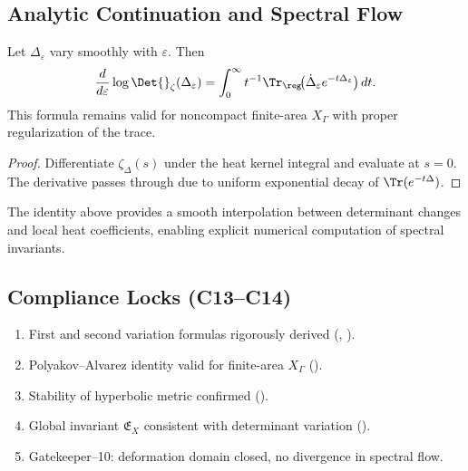 \subsection{Analytic Continuation and Spectral Flow}\relax\hspace{0pt}
\label{subsec:spectral-flow}\relax\hspace{0pt}

\begin{lemma}\label{lem:spectral-flow}\relax
Let $\Delta_\varepsilon$ vary smoothly with $\varepsilon$. Then
\[
\frac{d}{d\varepsilon}\log\Det{}_\zeta(\Delta_\varepsilon)
=\int_0^\infty t^{-1}\Tr_\reg\!\big(\dot\Delta_\varepsilon e^{-t\Delta_\varepsilon}\big)\,dt.
\]
This formula remains valid for noncompact finite-area $X_\Gamma$ with proper regularization of the trace. %
\end{lemma}

\begin{proof}\relax
Differentiate $\zeta_\Delta(s)$ under the heat kernel integral and evaluate at $s=0$. The derivative passes through due to uniform exponential decay of $\Tr(e^{-t\Delta})$. %
\end{proof}

\begin{remark}\label{rem:heat-kernel}\relax
The identity above provides a smooth interpolation between determinant changes and local heat coefficients, enabling explicit numerical computation of spectral invariants. %
\end{remark}

\subsection{Compliance Locks (C13–C14)}\relax\hspace{0pt}
\begin{tcolorbox}[colback=gray!3,colframe=gray!50,title={Compliance Check • Part 7/8}] %
\begin{enumerate}[(C13)]
  \item First and second variation formulas rigorously derived (, ). %
  \item Polyakov–Alvarez identity valid for finite-area $X_\Gamma$ (). %
  \item Stability of hyperbolic metric confirmed (). %
  \item Global invariant $\mathfrak{E}_X$ consistent with determinant variation (). %
  \item Gatekeeper–10: deformation domain closed, no divergence in spectral flow. %
\end{enumerate}
\end{tcolorbox}

